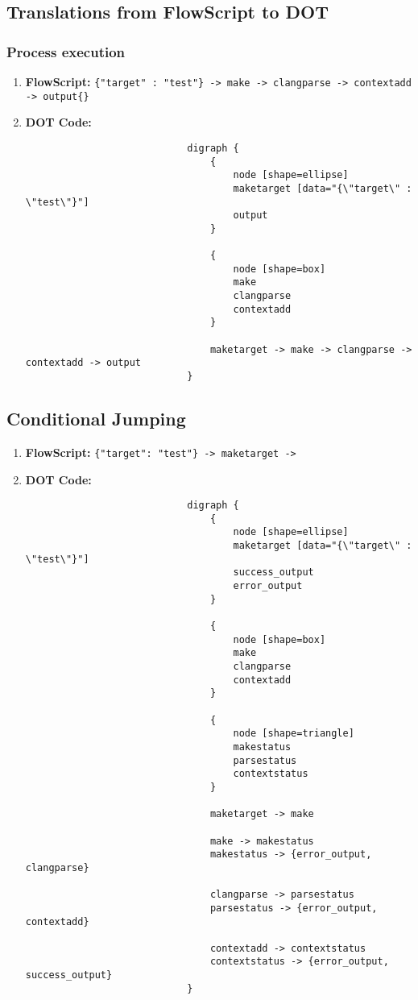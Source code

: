 \documentclass{article}
\begin{document}
		\subsection{Translations from FlowScript to DOT}
			\subsubsection{Process execution}
				\begin{enumerate}
					\item \textbf{FlowScript:} \texttt{\{"target" : "test"\} -> make -> clangparse -> contextadd -> output\{\}} \\
					\item \textbf{DOT Code:}
						\begin{verbatim}
							digraph {
							    {
							        node [shape=ellipse]
							        maketarget [data="{\"target\" : \"test\"}"]
							        output
							    }

							    {
							        node [shape=box]
							        make
							        clangparse
							        contextadd
							    }

							    maketarget -> make -> clangparse -> contextadd -> output
							}
						\end{verbatim}
				\end{enumerate}
			\subsection{Conditional Jumping}
				\begin{enumerate}
					\item \textbf{FlowScript:} \texttt{\{"target": "test"\} -> maketarget -> {}} \\
					\item \textbf{DOT Code:} \begin{verbatim}
							digraph {
							    {
							        node [shape=ellipse]
							        maketarget [data="{\"target\" : \"test\"}"]
							        success_output
							        error_output
							    }

							    {
							        node [shape=box]
							        make
							        clangparse
							        contextadd
							    }

							    {
							        node [shape=triangle]
							        makestatus 
							        parsestatus
							        contextstatus
							    }

							    maketarget -> make

							    make -> makestatus
							    makestatus -> {error_output, clangparse}
    
							    clangparse -> parsestatus
							    parsestatus -> {error_output, contextadd}

							    contextadd -> contextstatus
							    contextstatus -> {error_output, success_output}
							}
						\end{verbatim}
				\end{enumerate}
\end{document}
